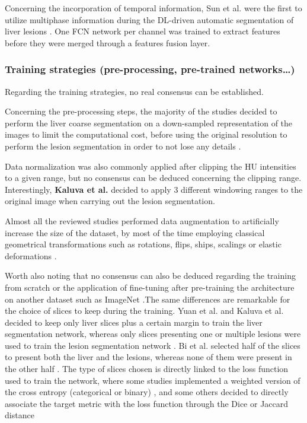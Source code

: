 \documentclass[]{article}
\begin{document}
Concerning the incorporation of temporal information, Sun et
	al. were the first to utilize multiphase information during the
DL-driven automatic segmentation of liver lesions \cite{Sun2017}. One FCN network per
channel was trained to extract features before they were merged through
a features fusion layer.

\subsubsection*{Training strategies (pre-processing, pre-trained networks\ldots{})}

Regarding the training strategies, no real consensus can be established.

Concerning the pre-processing steps, the majority of the studies decided
to perform the liver coarse segmentation on a down-sampled
representation of the images to limit the computational cost, before
using the original resolution to perform the lesion segmentation in
order to not lose any details \cite{Li2018, Han2017, Yuan2017, Kaluva2018, Vorontsov2018}.

Data normalization was also commonly applied after clipping the HU
intensities to a given range, but no consensus can be deduced concerning
the clipping range. Interestingly, \textbf{Kaluva et al.} decided to
apply 3 different windowing ranges to the original image when carrying
out the lesion segmentation.

Almost all the reviewed studies performed data augmentation to
artificially increase the size of the dataset, by most of the time
employing classical geometrical transformations such as rotations,
flips, ships, scalings or elastic deformations \cite{Frid-adar2017, Ben-Cohen, Rafiei2018, Christ2017, Li2018, Han2017, Yuan2017, Bellver2017, Bi2017, Vorontsov2018}.

Worth also noting that no consensus can also be deduced regarding the
training from scratch or the application of fine-tuning after
pre-training the architecture on another dataset such as ImageNet \cite{Bi2017, Bellver2017, Christ2017} .The same differences are remarkable for the choice of slices to
keep during the training. Yuan et al. and Kaluva et al. decided to keep only liver slices plus a certain margin to train the
liver segmentation network, whereas only slices presenting one or
multiple lesions were used to train the lesion segmentation network \cite{Yuan2017, Kaluva2018}.
Bi et al. selected half of the slices to present both the liver
and the lesions, whereas none of them were present in the other half \cite{Bi2017}.
The type of slices chosen is directly linked to the loss function used
to train the network, where some studies implemented a weighted version
of the cross entropy (categorical or binary) \cite{Han2017, Bellver2017, Ben-Cohen, Christ2017}, and some others decided to directly associate the target metric
with the loss function through the Dice or Jaccard distance \cite{Yuan2017, Chlebus2018, Vorontsov2018}
\end{document}
